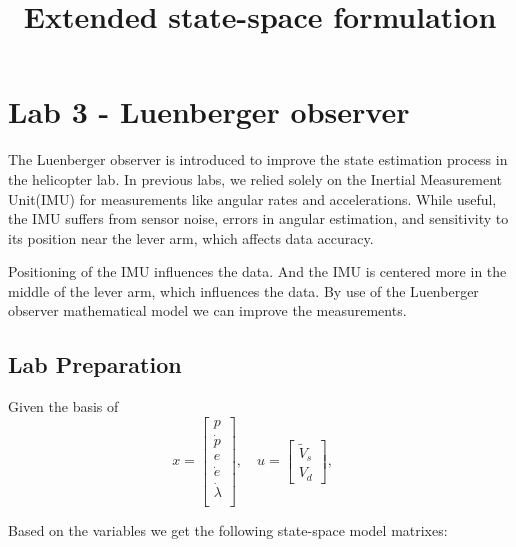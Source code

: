 
\section{Lab 3 - Luenberger observer}



The Luenberger observer is introduced to improve the state estimation process in the helicopter lab. In previous labs, we relied solely on the Inertial Measurement Unit(IMU) for measurements like angular rates and accelerations. While useful, the IMU suffers from sensor noise, errors in angular estimation, and sensitivity to its position near the lever arm, which affects data accuracy.
\vspace{1em}

Positioning of the IMU influences the data. And the IMU is centered more in the middle of the lever arm, which influences the data.
By use of the Luenberger observer mathematical model we can improve the measurements.
\vspace{1em}

\subsection{Lab Preparation}
\title{\textbf{Extended state-space formulation}}
\maketitle
\vspace{1em}


Given the basis of
\[
x =
\begin{bmatrix}
{p} \\
\dot{p}\\
{e} \\
\dot{e} \\

\dot{{\lambda}} \\


\end{bmatrix}, \quad
u =
\begin{bmatrix}
\tilde{V}_s \\
V_d
\end{bmatrix}, \quad
\]

Based on the variables we get the following state-space model matrixes:

